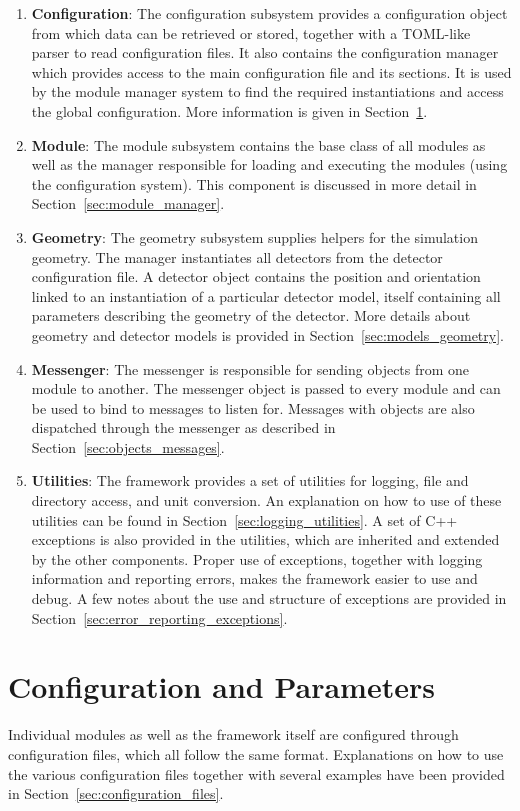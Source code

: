 \begin{enumerate}
\item \textbf{Configuration}: The configuration subsystem provides a configuration object from which data can be retrieved or stored, together with a TOML-like~\cite{tomlgit} parser to read configuration files.
It also contains the \apsq configuration manager which provides access to the main configuration file and its sections.
It is used by the module manager system to find the required instantiations and access the global configuration.
More information is given in Section~\ref{sec:config_parameters}.
\item \textbf{Module}: The module subsystem contains the base class of all \apsq modules as well as the manager responsible for loading and executing the modules (using the configuration system).
This component is discussed in more detail in Section~\ref{sec:module_manager}.
\item \textbf{Geometry}: The geometry subsystem supplies helpers for the simulation geometry.
The manager instantiates all detectors from the detector configuration file.
A detector object contains the position and orientation linked to an instantiation of a particular detector model, itself containing all parameters describing the geometry of the detector.
More details about geometry and detector models is provided in Section~\ref{sec:models_geometry}.
\item \textbf{Messenger}: The messenger is responsible for sending objects from one module to another.
The messenger object is passed to every module and can be used to bind to messages to listen for.
Messages with objects are also dispatched through the messenger as described in Section~\ref{sec:objects_messages}.
\item \textbf{Utilities}: The framework provides a set of utilities for logging, file and directory access, and unit conversion.
An explanation on how to use of these utilities can be found in Section~\ref{sec:logging_utilities}.
A set of C++ exceptions is also provided in the utilities, which are inherited and extended by the other components.
Proper use of exceptions, together with logging information and reporting errors, makes the framework easier to use and debug.
A few notes about the use and structure of exceptions are provided in Section~\ref{sec:error_reporting_exceptions}.
\end{enumerate}

\section{Configuration and Parameters}
\label{sec:config_parameters}
Individual modules as well as the framework itself are configured through configuration files, which all follow the same format.
Explanations on how to use the various configuration files together with several examples have been provided in Section~\ref{sec:configuration_files}.

